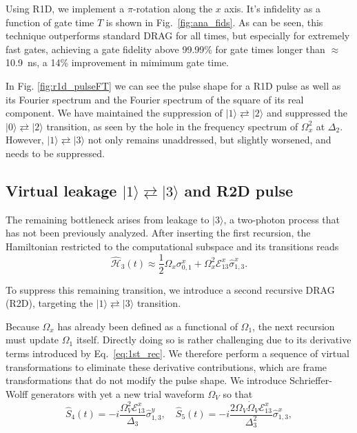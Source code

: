 \documentclass[superscriptaddress,amsmath,amssymb,aps,twocolumn,praplied,notitlepage]{revtex4-2}
\newcommand{\ket}[1]{\vert #1 \rangle}
\begin{document}
Using R1D, we implement a $\pi$-rotation along the $x$ axis. { It's infidelity as a function of gate time $T$ is shown in Fig.~\ref{fig:ana_fids}}. As can be seen, this technique outperforms standard DRAG for all times, but especially for extremely fast gates, achieving a gate fidelity above 99.99\% for gate times longer than $\approx$ 10.9~ns, a 14\% improvement in mimimum gate time.

{ In Fig. \ref{fig:r1d_pulseFT} we can see the pulse shape for a R1D pulse as well as its Fourier spectrum and the Fourier spectrum of the square of its real component. We have maintained the suppression of $\ket{1}\rightleftarrows\ket{2}$ and suppressed the $\ket{0}\rightleftarrows\ket{2}$ transition, as seen by the hole in the frequency spectrum of $\Omega_x^2$ at $\Delta_2$. However, $\ket{1}\rightleftarrows\ket{3}$ not only remains unaddressed, but slightly worsened, and needs to be suppressed. }





\subsection{Virtual leakage $\ket{1}\rightleftarrows\ket{3}$ and R2D pulse}
\label{R2D}

The remaining bottleneck arises from leakage to $\ket{3}$, a two-photon process that has not been previously analyzed.
After inserting the first recursion, the Hamiltonian restricted to the computational subspace and its transitions reads
\begin{equation}
     \hat{\mathcal{H}}_3(t) \approx\frac{1}{2} \Omega_x  \sigma_{0,1}^x+ \Omega_x^2 \mathcal{E}^x_{13}\hat{\sigma}_{1,3}^x.
\end{equation}

To suppress this remaining transition, we introduce a second recursive DRAG (R2D), targeting the $\ket{1}\rightleftarrows\ket{3}$ transition.

Because \(\Omega_x\) has already been defined as a functional of \(\Omega_1\), the next recursion must update \(\Omega_1\) itself.
Directly doing so is rather challenging due to its derivative terms introduced by Eq.~\eqref{eq:1st_rec}. We therefore perform a sequence of virtual transformations to eliminate these derivative contributions, which are frame transformations that do not modify the pulse shape. We introduce Schrieffer-Wolff generators with yet a new trial waveform {$\Omega_V$} so that
\begin{equation}
   \hat{S}_4(t) = -i\frac{\Omega_V^2 \mathcal{E}^x_{13}}{\Delta_3}\hat{\sigma}_{1,3}^y,\quad  \hat{S}_5(t) = -i\frac{2\Omega_V\dot \Omega_V \mathcal{E}^x_{13}}{\Delta_3^2}\hat{\sigma}_{1,3}^x, 
\end{equation}
\end{document}
